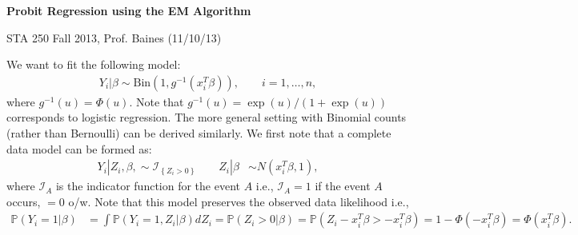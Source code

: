 \documentclass[11pt]{article}
\def\Pr{\mathbb{P}}
\begin{document}
\textbf{Probit Regression using the EM Algorithm}

\begin{flushright}
 STA 250 Fall 2013, Prof. Baines (11/10/13)
\end{flushright}

We want to fit the following model:
\begin{align}\label{odm}
 Y_{i} | \beta \sim \textrm{Bin}\left(1,g^{-1}(x_{i}^{T}\beta)\right) , \qquad i=1,\ldots,n,
\end{align}
where $g^{-1}(u)=\Phi(u)$. Note that $g^{-1}(u)=\exp(u)/(1+\exp(u))$ corresponds to logistic regression.
The more general setting with Binomial counts (rather than Bernoulli) can be derived similarly.
We first note that a complete data model can be formed as:
\begin{align}
\label{cdm}
 Y_{i} | Z_{i}, \beta, \sim \mathcal{I}_{\left\{Z_{i}>0\right\}} \qquad Z_{i} | \beta &\sim N(x_{i}^{T}\beta,1) ,
\end{align}
where $\mathcal{I}_{A}$ is the indicator function for the event $A$ i.e., $\mathcal{I}_{A}=1$ if the event $A$ occurs, $=0$ o/w. Note that this model preserves the observed data likelihood i.e.,
\begin{align*}
\Pr\left(Y_{i}=1|\beta\right) &= \int{}\Pr(Y_{i}=1,Z_{i}|\beta)dZ_{i} = \Pr(Z_{i}>0|\beta) = \Pr(Z_{i}-x_{i}^{T}\beta > -x_{i}^{T}\beta) = 1-\Phi(-x_{i}^{T}\beta) = \Phi(x_{i}^{T}\beta) .
\end{align*}
\end{document}
